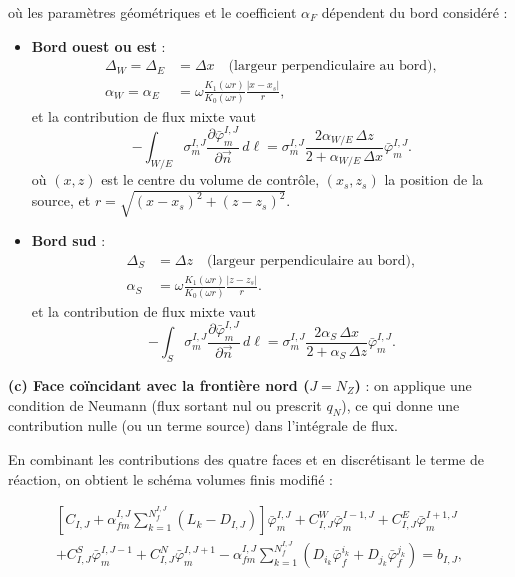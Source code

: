 où les paramètres géométriques et le coefficient $\alpha_F$ dépendent du bord considéré :
\begin{itemize}[label=$\circ$]
    \item \textbf{Bord ouest ou est} : 
    \begin{align*}
    \Delta_W = \Delta_E &= \Delta x \quad \text{(largeur perpendiculaire au bord)}, \\
    \alpha_W = \alpha_E &= \omega \frac{K_1(\omega r)}{K_0(\omega r)} \frac{|x - x_s|}{r},
    \end{align*}
    et la contribution de flux mixte vaut
    $$-\int_{W/E}\sigma_m^{I,J}\frac{\partial\bar{\varphi}_m^{I,J}}{\partial\vec{n}}\,d\ell
    =\sigma_m^{I,J}\frac{2\alpha_{W/E}\,\Delta z}{2+\alpha_{W/E}\,\Delta x}\bar{\varphi}_m^{I,J}.$$
    où $(x,z)$ est le centre du volume de contrôle, $(x_s, z_s)$ la position de la source, et $r = \sqrt{(x-x_s)^2 + (z-z_s)^2}$.
    
    \item \textbf{Bord sud} : 
    \begin{align*}
    \Delta_S &= \Delta z \quad \text{(largeur perpendiculaire au bord)}, \\
    \alpha_S &= \omega \frac{K_1(\omega r)}{K_0(\omega r)} \frac{|z - z_s|}{r}.
    \end{align*}
    et la contribution de flux mixte vaut
    $$-\int_{S}\sigma_m^{I,J}\frac{\partial\bar{\varphi}_m^{I,J}}{\partial\vec{n}}\,d\ell
    =\sigma_m^{I,J}\frac{2\alpha_S\,\Delta x}{2+\alpha_S\,\Delta z}\bar{\varphi}_m^{I,J}.$$
\end{itemize}

\textbf{(c) Face coïncidant avec la frontière nord ($J=N_Z$)} : on applique une condition de Neumann (flux sortant nul ou prescrit $q_N$), ce qui donne une contribution nulle (ou un terme source) dans l'intégrale de flux.

En combinant les contributions des quatre faces et en discrétisant le terme de réaction, on obtient le schéma volumes finis modifié :

\begin{equation}
\begin{split}
\left[C_{I,J}+\alpha_{fm}^{I,J}\sum_{k=1}^{N_f^{I,J}}(L_k-D_{I,J})\right]\bar{\varphi}_m^{I,J}
+C_{I,J}^W\bar{\varphi}_m^{I-1,J}+C_{I,J}^E\bar{\varphi}_m^{I+1,J} \\
+C_{I,J}^S\bar{\varphi}_m^{I,J-1}+C_{I,J}^N\bar{\varphi}_m^{I,J+1}-\alpha_{fm}^{I,J}\sum_{k=1}^{N_f^{I,J}}\left(D_{i_k}\bar{\varphi}_f^{i_k}+D_{j_k}\bar{\varphi}_f^{j_k}\right)=b_{I,J},
\end{split}
\label{eq:scheme_with_bc}
\end{equation}

